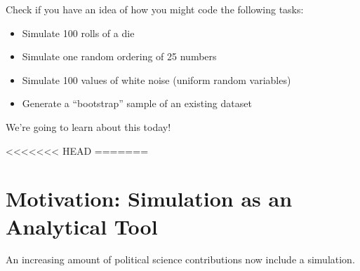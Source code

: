 \documentclass[]{book}
\newenvironment{Shaded}{\begin{snugshade}}{\end{snugshade}}
\providecommand{\tightlist}{%
  \setlength{\itemsep}{0pt}\setlength{\parskip}{0pt}}
\theoremstyle{definition}
\theoremstyle{definition}
\theoremstyle{definition}
\theoremstyle{remark}
\begin{document}
\begin{Shaded}
\begin{Highlighting}[]
\begin{Shaded}
\begin{Highlighting}[]
\begin{Shaded}
\begin{Highlighting}[]
Check if you have an idea of how you might code the following tasks:

\begin{itemize}
\tightlist
\item
  Simulate 100 rolls of a die
\item
  Simulate one random ordering of 25 numbers
\item
  Simulate 100 values of white noise (uniform random variables)
\item
  Generate a ``bootstrap'' sample of an existing dataset
\end{itemize}

We're going to learn about this today!

<<<<<<< HEAD
=======
\hypertarget{motivation-simulation-as-an-analytical-tool}{%
\section{Motivation: Simulation as an Analytical Tool}\label{motivation-simulation-as-an-analytical-tool}}

An increasing amount of political science contributions now include a simulation.


\end{Highlighting}
\end{Shaded}
\end{Highlighting}
\end{Shaded}
\end{Highlighting}
\end{Shaded}
\end{document}
